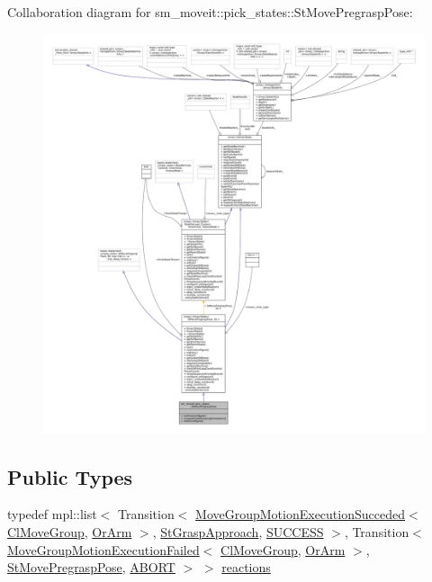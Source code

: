 Collaboration diagram for sm\+\_\+moveit\+:\+:pick\+\_\+states\+:\+:St\+Move\+Pregrasp\+Pose\+:
\nopagebreak
\begin{figure}[H]
\begin{center}
\leavevmode
\includegraphics[width=350pt]{structsm__moveit_1_1pick__states_1_1StMovePregraspPose__coll__graph}
\end{center}
\end{figure}
\subsection*{Public Types}
\begin{DoxyCompactItemize}
\item 
typedef mpl\+::list$<$ Transition$<$ \hyperlink{structmoveit__z__client_1_1MoveGroupMotionExecutionSucceded}{Move\+Group\+Motion\+Execution\+Succeded}$<$ \hyperlink{classmoveit__z__client_1_1ClMoveGroup}{Cl\+Move\+Group}, \hyperlink{classsm__moveit_1_1OrArm}{Or\+Arm} $>$, \hyperlink{structsm__moveit_1_1pick__states_1_1StGraspApproach}{St\+Grasp\+Approach}, \hyperlink{classSUCCESS}{S\+U\+C\+C\+E\+SS} $>$, Transition$<$ \hyperlink{structmoveit__z__client_1_1MoveGroupMotionExecutionFailed}{Move\+Group\+Motion\+Execution\+Failed}$<$ \hyperlink{classmoveit__z__client_1_1ClMoveGroup}{Cl\+Move\+Group}, \hyperlink{classsm__moveit_1_1OrArm}{Or\+Arm} $>$, \hyperlink{structsm__moveit_1_1pick__states_1_1StMovePregraspPose}{St\+Move\+Pregrasp\+Pose}, \hyperlink{classABORT}{A\+B\+O\+RT} $>$ $>$ \hyperlink{structsm__moveit_1_1pick__states_1_1StMovePregraspPose_a24457ed9411566498ea50222265ad652}{reactions}
\end{DoxyCompactItemize}
